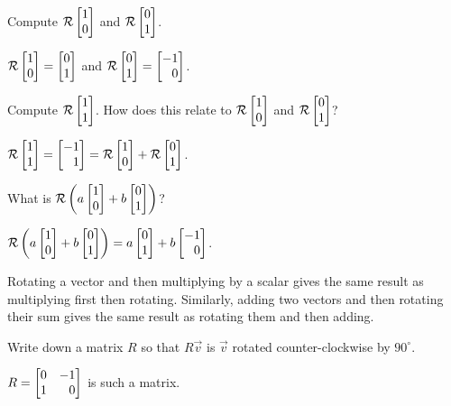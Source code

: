 \documentclass{problemset}
\newcommand{\bookonlynewpage}{\begin{bookonly}\newpage\end{bookonly}}
\begin{document}
	\begin{parts}
		\item Compute $\mathcal R\mat{1\\0}$ and $\mathcal R\mat{0\\1}$.
			\begin{solution}[inline]
				$\mathcal R\mat{1\\0}=\mat{0\\1}$ and
				$\mathcal R\mat{0\\1}=\mat{-1\\0}$.
			\end{solution}
		\item Compute $\mathcal R\mat{1\\1}$. How does this relate to
			$\mathcal R\mat{1\\0}$ and $\mathcal R\mat{0\\1}$?
			\begin{solution}
				$\mathcal R\mat{1\\1}=\mat{-1\\1}=\mathcal R\mat{1\\0}+\mathcal R\mat{0\\1}$.
			\end{solution}
		\item What is $\mathcal R\left(a\mat{1\\0}+b\mat{0\\1}\right)$?
			\begin{solution}
				$\mathcal R\left(a\mat{1\\0}+b\mat{0\\1}\right)=a\mat{0\\1}+b\mat{-1\\0}$.

				Rotating a vector and then multiplying by a scalar gives the same
				result as multiplying first then rotating. Similarly, adding two
				vectors and then rotating their sum gives the same result as rotating
				them and then adding.
			\end{solution}
		\item Write down a matrix $R$ so that $R\vec v$ is $\vec v$ rotated
			counter-clockwise by $90^\circ$.
			\begin{solution}
				$R = \mat{0&-1\\1&0}$ is such a matrix.
			\end{solution}
	\end{parts}

	\bookonlynewpage
\end{document}
